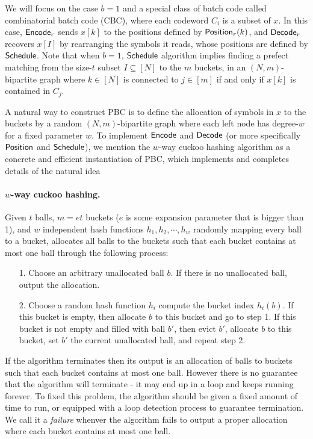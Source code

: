 We will focus on the case $b=1$ and a special class of batch code called combinatorial batch code (CBC)\cite{cryptoeprint:2017/1142,10.1145/1007352.1007396,cryptoeprint:2008/306}, where each codeword $C_i$ is a subset of $x$. In this case, ${\sf Encode}_r$ sends $x[k]$ to the positions defined by ${\sf Position}_r(k)$, and ${\sf Decode}_r$ recovers $x[I]$ by rearranging the symbols it reads, whose positions are defined by ${\sf Schedule}$. Note that when $b=1$, ${\sf Schedule}$ algorithm implies finding a prefect matching from the size-$t$ subset $I\subseteq[N]$ to the $m$ buckets, in an $(N,m)$-bipartite graph where $k\in[N]$ is connected to $j\in[m]$ if and only if $x[k]$ is contained in $C_j$. 

A natural way to construct PBC is to define the allocation of symbols in $x$ to the buckets by a random $(N,m)$-bipartite graph where each left node has degree-$w$ for a fixed parameter $w$. To implement ${\sf Encode}$ and ${\sf Decode}$ (or more specifically ${\sf Position}$ and ${\sf Schedule}$), we mention the $w$-way cuckoo hashing algorithm\cite{10.1007/3-540-44676-1_10} as a concrete and efficient instantiation of PBC\cite{cryptoeprint:2017/1142,cryptoeprint:2018/579,yeo_cuckoo_2023}, which implements and completes details of the natural idea

\paragraph{$w$-way cuckoo hashing.}Given $t$ balls, $m=et$ buckets ($e$ is some expansion parameter that is bigger than 1), and $w$ independent hash functions $h_1, h_2,\cdots, h_w$ randomly mapping every ball to a bucket, allocates all balls to the buckets such that each bucket contains at most one ball through the following process: 
\begin{itemize}
  \item[1.] Choose an arbitrary unallocated ball $b$. If there is no unallocated ball, output the allocation. 
  \item[2.] Choose a random hash function $h_i$ compute the bucket index $h_i(b)$. If this bucket is empty, then allocate $b$ to this bucket and go to step 1. If this bucket is not empty and filled with ball $b'$, then evict $b'$, allocate $b$ to this bucket, set $b'$ the current unallocated ball, and repeat step 2. 
\end{itemize}
If the algorithm terminates then its output is an allocation of balls to buckets such that each bucket contains at most one ball. However there is no guarantee that the algorithm will terminate - it may end up in a loop and keeps running forever. To fixed this problem, the algorithm should be given a fixed amount of time to run, or equipped with a loop detection process to guarantee termination. We call it a \emph{failure} whenver the algorithm fails to output a proper allocation where each bucket contains at most one ball. 

